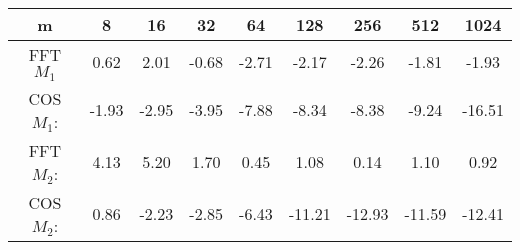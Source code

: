\begin{minipage}{\textwidth}
\begin{center}
\begin{framed}
\begin{tabular}{c|c|c|c|c|c|c|c|c}
m & 8 & 16 & 32 & 64 & 128 & 256 & 512 & 1024 \\
\hline
FFT \(M_1\) & 0.62 &  2.01 & -0.68 & -2.71 & -2.17 & -2.26 & -1.81 & -1.93 \\
COS \(M_1\): &-1.93 &  -2.95 &  -3.95 &  -7.88 &  -8.34 &  -8.38 &  -9.24 & -16.51\\
FFT \(M_2\): & 4.13 & 5.20 & 1.70 & 0.45 & 1.08 & 0.14 & 1.10 & 0.92 \\
COS \(M_2\):   & 0.86 & -2.23 &  -2.85 &-6.43 & -11.21 & -12.93 & -11.59 & -12.41\\
\end{tabular} 
 \label{table3}
\end{framed}
\end{center}
\end{minipage}